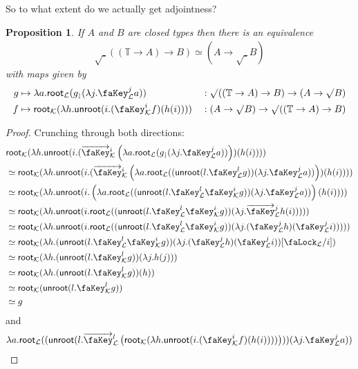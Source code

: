 \documentclass[10pt]{article}
\newtheorem{proposition}[theorem]{Proposition}
\theoremstyle{definition}
\let\oldequiv\equiv%
\renewcommand{\equiv}{\simeq}
\newcommand{\defeq}{\oldequiv}
\newcommand{\lock}{\text{\faLock}}
\newcommand{\key}{\text{\faKey}}
\newcommand{\Tiny}{\mathbb{T}}
\newcommand{\lockn}[1]{\mathcal{#1}}
\newcommand{\varkey}[2]{\key_{\lockn{#1}}^{#2}}
\newcommand{\admkey}[2]{\overrightarrow{\key}_{\lockn{#1}}^{#2}}
\newcommand{\locksub}[2]{\lock_{#1}/#2}
\newcommand{\rform}[2]{\surd_{\lockn{#1}} #2}
\newcommand{\rintro}[2]{\mathsf{root}_{\lockn{#1}}(#2)}
\newcommand{\relim}[1]{\mathsf{unroot}(#1)}
\newcommand{\rget}[1]{#1_{\downharpoonleft}}
\begin{document}
So to what extent do we actually get adjointness?
\begin{proposition}
If $A$ and $B$ are closed types then there is an equivalence
\begin{align*}
\rform{} ((\Tiny \to A) \to B) \equiv (A \to \rform{} B)
\end{align*}
with maps given by
\begin{alignat*}{2}
g &\mapsto \lambda a. \rintro{L}{\rget{g}(\lambda j.\varkey{L}{j} a)} &&: \rform{}((\Tiny \to A) \to B) \to (A \to \rform{} B) \\
f &\mapsto \rintro{K}{\lambda h. \relim{i.(\varkey{K}{i} f)(h(i))}} &&: (A \to \rform{} B) \to \rform{} ((\Tiny \to A) \to B)
\end{alignat*}
\end{proposition}
\begin{proof}
Crunching through both directions:
\begin{align*}
&\rintro{K}{\lambda h. \relim{i.(\admkey{K}{i} \left(\lambda a. \rintro{L}{\rget{g}(\lambda j.\varkey{L}{j} a)}\right))(h(i))}} \\
&\defeq \rintro{K}{\lambda h. \relim{i.(\admkey{K}{i} \left(\lambda a. \rintro{L}{(\relim{l.\varkey{L}{l} g})(\lambda j.\varkey{L}{j} a)}\right))(h(i))}} \\
&\defeq \rintro{K}{\lambda h. \relim{i.\left(\lambda a. \rintro{L}{(\relim{l.\varkey{L}{l} \varkey{K}{i} g})(\lambda j.\varkey{L}{j} a)}\right)(h(i))}} \\
&\defeq \rintro{K}{\lambda h. \relim{i.\rintro{L}{(\relim{l.\varkey{L}{l} \varkey{K}{i} g})(\lambda j.\admkey{L}{j} h(i))}}} \\
&\defeq \rintro{K}{\lambda h. \relim{i.\rintro{L}{(\relim{l.\varkey{L}{l} \varkey{K}{i} g})(\lambda j.(\varkey{L}{j} h)(\varkey{L}{j} i))}}} \\
&\defeq \rintro{K}{\lambda h. (\relim{l.\varkey{L}{l} \varkey{K}{i} g})(\lambda j.(\varkey{L}{j} h)(\varkey{L}{j} i))[\locksub{\lockn{L}}{i}]} \\
&\defeq \rintro{K}{\lambda h. (\relim{l.\varkey{K}{l} g})(\lambda j.h( j))} \\
&\defeq \rintro{K}{\lambda h. (\relim{l.\varkey{K}{l} g})(h)} \\
&\defeq \rintro{K}{\relim{l.\varkey{K}{l} g}} \\
&\defeq g
\end{align*}
and
\begin{align*}
&\lambda a. \rintro{L}{(\relim{l.\admkey{L}{l} \left(\rintro{K}{\lambda h. \relim{i.(\varkey{K}{i} f)(h(i))}}\right)})(\lambda j.\varkey{L}{j} a)} \\

\end{align*}
\end{proof}
\end{document}
